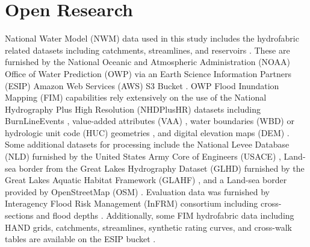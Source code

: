 \documentclass[draft]{dependencies/agujournal2019}
\begin{document}
\section*{Open Research}
%
National Water Model (NWM) data used in this study includes the hydrofabric related datasets \cite{nwm2022hydrofabric} including catchments, streamlines, and reservoirs \cite{nwm2022hydrofabric}.
These are furnished by the National Oceanic and Atmospheric Administration (NOAA) Office of Water Prediction (OWP) via an Earth Science Information Partners (ESIP) Amazon Web Services (AWS) S3 Bucket \cite{esipData2022}.
OWP Flood Inundation Mapping (FIM) capabilities rely extensively on the use of the National Hydrography Plus High Resolution (NHDPlusHR) datasets including BurnLineEvents \cite{nhdplus2022vectors}, value-added attributes (VAA) \cite{nhdplus2022vectors}, water boundaries (WBD) or hydrologic unit code (HUC) geometries \cite{nhdplus2022wbd}, and digital elevation maps (DEM) \cite{nhdplus2022dems}.
Some additional datasets for processing include the National Levee Database (NLD) furnished by the United States Army Core of Engineers (USACE) \cite{engineers2016national}, Land-sea border from the Great Lakes Hydrography Dataset (GLHD) furnished by the Great Lakes Aquatic Habitat Framework (GLAHF) \cite{GreatLakesHydrographyDataset}, and a Land-sea border provided by OpenStreetMap (OSM) \cite{osm2021landsea}.
Evaluation data was furnished by Interagency Flood Risk Management (InFRM) consortium including cross-sections and flood depths \cite{fema2021base,fema2021estimated}.
Additionally, some FIM hydrofabric data including HAND grids, catchments, streamlines, synthetic rating curves, and cross-walk tables are available on the ESIP bucket \cite{esipData2022}.
\end{document}
